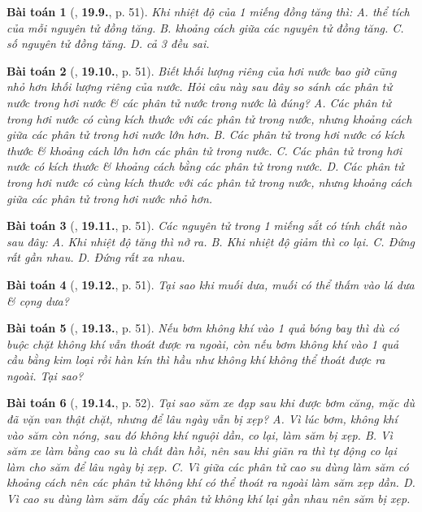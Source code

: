 \documentclass{article}
\numberwithin{equation}{section}
\newtheorem{baitoan}{Bài toán}
\begin{document}
\begin{baitoan}[\cite{SBT_Vat_Ly_8}, \textbf{19.9.}, p. 51]
	Khi nhiệt độ của 1 miếng đồng tăng thì: {\sf A.} thể tích của mỗi nguyên tử đồng tăng. {\sf B.} khoảng cách giữa các nguyên tử đồng tăng. {\sf C.} số nguyên tử đồng tăng. {\sf D.} cả 3 đều sai.
\end{baitoan}

\begin{baitoan}[\cite{SBT_Vat_Ly_8}, \textbf{19.10.}, p. 51]
	Biết khối lượng riêng của hơi nước bao giờ cũng nhỏ hơn khối lượng riêng của nước. Hỏi câu này sau đây so sánh các phân tử nước trong hơi nước \& các phân tử nước trong nước là đúng? {\sf A.} Các phân tử trong hơi nước có cùng kích thước với các phân tử trong nước, nhưng khoảng cách giữa các phân tử trong hơi nước lớn hơn. {\sf B.} Các phân tử trong hơi nước có kích thước \& khoảng cách lớn hơn các phân tử trong nước. {\sf C.} Các phân tử trong hơi nước có kích thước \& khoảng cách bằng các phân tử trong nước. {\sf D.} Các phân tử trong hơi nước có cùng kích thước với các phân tử trong nước, nhưng khoảng cách giữa các phân tử trong hơi nước nhỏ hơn.
\end{baitoan}

\begin{baitoan}[\cite{SBT_Vat_Ly_8}, \textbf{19.11.}, p. 51]
	Các nguyên tử trong 1 miếng sắt có tính chất nào sau đây: {\sf A.} Khi nhiệt độ tăng thì nở ra. {\sf B.} Khi nhiệt độ giảm thì co lại. {\sf C.} Đứng rất gần nhau. {\sf D.} Đứng rất xa nhau.
\end{baitoan}

\begin{baitoan}[\cite{SBT_Vat_Ly_8}, \textbf{19.12.}, p. 51]
	Tại sao khi muối dưa, muối có thể thấm vào lá dưa \& cọng dưa?
\end{baitoan}

\begin{baitoan}[\cite{SBT_Vat_Ly_8}, \textbf{19.13.}, p. 51]
	Nếu bơm không khí vào 1 quả bóng bay thì dù có buộc chặt không khí vẫn thoát được ra ngoài, còn nếu bơm không khí vào 1 quả cầu bằng kim loại rồi hàn kín thì hầu như không khí không thể thoát được ra ngoài. Tại sao?
\end{baitoan}

\begin{baitoan}[\cite{SBT_Vat_Ly_8}, \textbf{19.14.}, p. 52]
	Tại sao săm xe đạp sau khi được bơm căng, mặc dù đã vặn van thật chặt, nhưng để lâu ngày vẫn bị xẹp? {\sf A.} Vì lúc bơm, không khí vào săm còn nóng, sau đó không khí nguội dần, co lại, làm săm bị xẹp. {\sf B.} Vì săm xe làm bằng cao su là chất đàn hồi, nên sau khi giãn ra thì tự động co lại làm cho săm để lâu ngày bị xẹp. {\sf C.} Vì giữa các phân tử cao su dùng làm săm có khoảng cách nên các phân tử không khí có thể thoát ra ngoài làm săm xẹp dần. {\sf D.} Vì cao su dùng làm săm đẩy các phân tử không khí lại gần nhau nên săm bị xẹp.
\end{baitoan}
\end{document}
